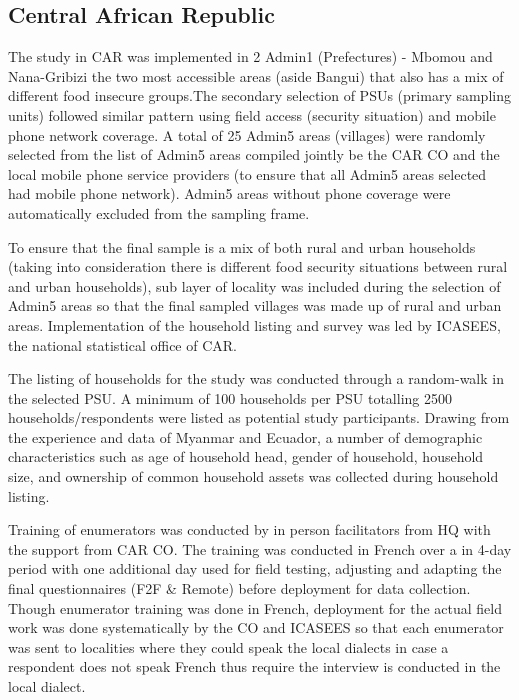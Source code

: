 \documentclass[11pt,harvard]{article}
\begin{document}
\subsection{Central African Republic}
	
The study in CAR was implemented in 2 Admin1 (Prefectures) - Mbomou and Nana-Gribizi the two most accessible areas (aside Bangui) that also has a mix of different food insecure groups.The secondary selection of PSUs (primary sampling units) followed similar pattern using field access (security situation) and mobile phone network coverage. A total of 25 Admin5 areas (villages) were randomly selected from the list of Admin5 areas compiled jointly be the CAR CO and the local mobile phone service providers (to ensure that all Admin5 areas selected had mobile phone network). Admin5 areas without phone coverage were automatically excluded from the sampling frame.
 
To ensure that the final sample is a mix of both rural and urban households (taking into consideration there is different food security situations between rural and urban households),  sub layer of locality was included during the selection of Admin5 areas so that the final sampled villages was made up of rural and urban areas. Implementation of the household listing and survey was led by ICASEES, the national statistical office of CAR.  

The listing of households for the study was conducted through a random-walk in the selected PSU. A minimum of 100 households per PSU totalling 2500 households/respondents were listed as potential study participants. Drawing from the experience and data of Myanmar and Ecuador, a number of demographic characteristics such as age of household head, gender of household, household size, and ownership of common household assets was collected during household listing.
 
Training of enumerators was conducted by in person facilitators from HQ with the support from CAR CO. The training was conducted in French over a in 4-day period with one additional day used for field testing, adjusting and adapting the final questionnaires (F2F \& Remote) before deployment for data collection. Though enumerator training was done in French, deployment for the actual field work was done systematically by the CO and ICASEES so that each enumerator was sent to localities where they could speak the local dialects in case a respondent does not speak French thus require the interview is conducted in the local dialect.
\end{document}
